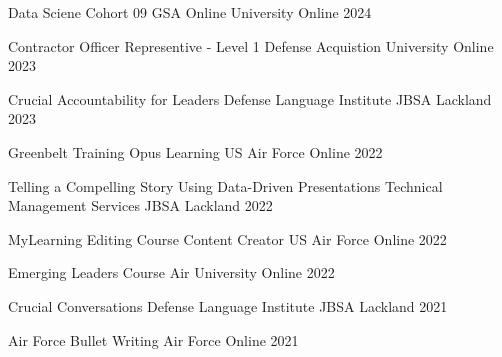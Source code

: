 



\begin{cvhonors}

\cvhonor
{Data Sciene Cohort 09} %
{GSA Online University} %
{Online} %
{2024} %

\cvhonor
{Contractor Officer Representive - Level 1} %
{Defense Acquistion University} %
{Online} %
{2023} %

\cvhonor
{Crucial Accountability for Leaders} %
{Defense Language Institute} %
{JBSA Lackland} %
{2023} %

\cvhonor
{Greenbelt Training} %
{Opus Learning US Air Force} %
{Online} %
{2022} %

\cvhonor
{Telling a Compelling Story Using Data-Driven Presentations} %
{Technical Management Services} %
{JBSA Lackland} %
{2022} %

\cvhonor
{MyLearning Editing Course Content Creator} %
{US Air Force} %
{Online} %
{2022} %

\cvhonor
{Emerging Leaders Course} %
{Air University} %
{Online} %
{2022} %

\cvhonor
{Crucial Conversations} %
{Defense Language Institute} %
{JBSA Lackland} %
{2021} %

\cvhonor
{Air Force Bullet Writing} %
{Air Force} %
{Online} %
{2021} %

\end{cvhonors}
